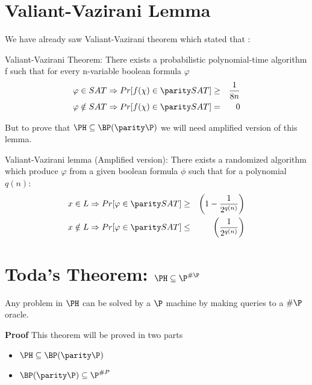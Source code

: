 \section{Valiant-Vazirani Lemma}
We have already saw Valiant-Vazirani theorem which stated that :
\begin{lemma} Valiant-Vazirani Theorem: There exists a probabilistic
polynomial-time algorithm f such that for every n-variable boolean
formula $\varphi$
\begin{eqnarray*}
  \varphi\in SAT\Rightarrow Pr[f(\chi)\in \parity SAT] &\geq& \frac{1}{8n} \\
  \varphi\notin SAT\Rightarrow Pr[f(\chi)\in \parity SAT] &=& 0
\end{eqnarray*}
\end{lemma}
But to prove that $\PH \subseteq \BP(\parity\P)$ we will need
amplified version of this lemma.
\begin{lemma}
Valiant-Vazirani lemma (Amplified version): There exists a randomized
algorithm which produce $\varphi$ from a given boolean formula $\phi$
such that for a polynomial $q(n)$:
\begin{eqnarray*}
  x\in L \Rightarrow Pr[\varphi\in \parity SAT] &\geq&
  \left(1-\frac{1}{2^{q(n)}}\right) \\ 
  x\notin L \Rightarrow Pr[\varphi\in \parity SAT] &\leq& \left(\frac{1}{2^{q(n)}}\right)
\end{eqnarray*}
\end{lemma}

\section{Toda's Theorem: $\PH\subseteq\P^{\#\P}$} Any problem in $\PH$
can be solved by a $\P$ machine by making queries to a $\#\P$ oracle.\newline

\textbf{Proof} \newline
This theorem will be proved in two parts
\begin{itemize}
 \item 
 $\PH\subseteq\BP(\parity\P)$
 \item
 $\BP(\parity\P) \subseteq \P^{\#P}$
\end{itemize}

